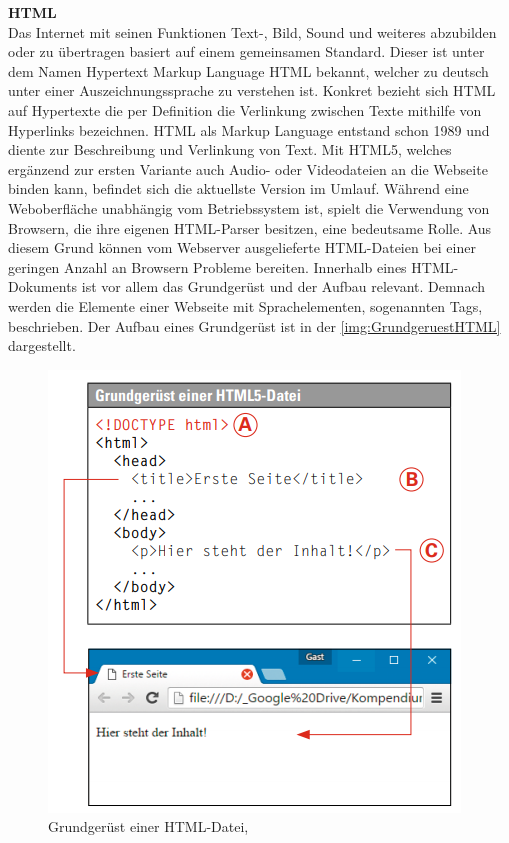 \documentclass[a4paper,titlepage,halfparskip,12pt]{scrreprt}
\begin{document}
\begin{onehalfspacing}
\textbf{\ac{HTML}}\\
Das Internet mit seinen Funktionen Text-, Bild, Sound und weiteres abzubilden oder zu übertragen basiert auf einem gemeinsamen Standard. Dieser ist unter dem Namen Hypertext Markup Language \ac{HTML} bekannt, welcher zu deutsch unter einer Auszeichnungssprache zu verstehen ist. Konkret bezieht sich HTML auf Hypertexte die per Definition die Verlinkung zwischen Texte mithilfe von Hyperlinks bezeichnen. \ac{HTML} als Markup Language entstand schon 1989 und diente zur Beschreibung und Verlinkung von Text. Mit \ac{HTML}5, welches ergänzend zur ersten Variante auch Audio- oder Videodateien an die Webseite binden kann, befindet sich die aktuellste Version im Umlauf. Während eine Weboberfläche unabhängig vom Betriebssystem ist, spielt die Verwendung von Browsern, die ihre eigenen HTML-Parser besitzen, eine bedeutsame Rolle. Aus diesem Grund können vom Webserver ausgelieferte \ac{HTML}-Dateien bei einer geringen Anzahl an Browsern Probleme bereiten. Innerhalb eines \ac{HTML}-Dokuments ist vor allem das Grundgerüst und der Aufbau relevant. Demnach werden die Elemente einer Webseite mit Sprachelementen, sogenannten Tags, beschrieben. Der Aufbau eines Grundgerüst ist in der \autoref{img:GrundgeruestHTML} dargestellt.
\begin{figure}[h]
	\centering
	\includegraphics[scale=1.3]{images/HTML_Grundgeruest}
	\caption{Grundgerüst einer HTML-Datei, \cite{buhler2017html5}}
	\label{img:GrundgeruestHTML}
\end{figure}

\end{onehalfspacing}
\end{document}
